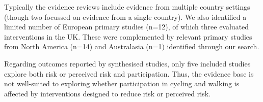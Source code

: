 \documentclass[a4paper,12pt]{article}
\begin{document}
\par Typically the evidence reviews include evidence from multiple 
country settings (though two focussed on evidence from a single 
country). We also identified a limited number of European primary 
studies (n=12), of which three evaluated interventions in the UK. 
These were complemented by relevant primary studies from North America 
(n=14) and Australasia (n=1) identified through our search. \\

\par Regarding outcomes reported by synthesised studies, only five 
included studies explore both risk or perceived risk and 
participation. Thus, the evidence base is not well-suited to exploring 
whether participation in cycling and walking is affected by 
interventions designed to reduce risk or perceived risk. \\

\newpage

\begin{footnotesize}
    
    
\end{footnotesize}
\end{document}
